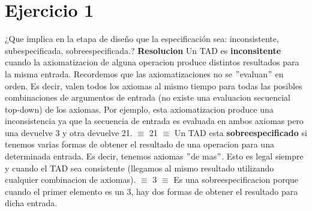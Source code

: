 \documentclass[10pt,a4paper]{article}
\begin{document}
\maketitle

\section{Ejercicio 1}

¿Que implica en la etapa de diseño que la especificación sea: inconsistente, subespecificada, sobreespecificada.?
\newline
\newline
\textbf{Resolucion}
\newline
\newline
Un TAD es \textbf{inconsitente} cuando la axiomatizacion de alguna operacion produce distintos resultados para la misma entrada. Recordemos que las axiomatizaciones no se $"$evaluan$"$ en orden. Es decir, valen todos los axiomas al mismo tiempo para todas las posibles combinaciones de argumentos de entrada (no existe una evaluacion secuencial top-down) de los axiomas.
\newline
\newline
Por ejemplo, esta axiomatizacion produce una inconsistencia ya que la secuencia de entrada  es evaluada en ambos axiomas pero una devuelve 3 y otra devuelve 21. 
\newline
\newline
{} $\equiv$ 21
\newline
\newline
{} $\equiv$ 
\newline
\newline
Un TAD esta \textbf{sobreespecificado} si tenemos varias formas de obtener el resultado de una operacion para una determinada entrada. Es decir, tenemos axiomas $"$de mas$"$. Esto es legal siempre y cuando el TAD sea consistente (llegamos al mismo resultado utilizando cualquier combinacion de axiomas). 
\newline
\newline
{} $\equiv$ 3 
\newline
\newline
{} $\equiv$ 
\newline
\newline
Es una sobreespecificacion porque cuando el primer elemento es un 3, hay dos formas de obtener el resultado para dicha entrada.
\end{document}
